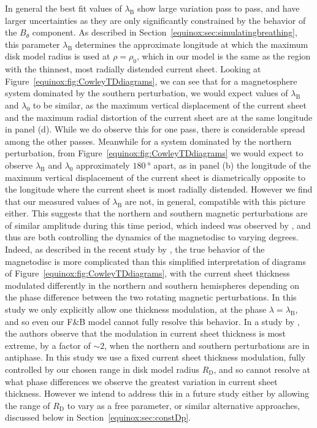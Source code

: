 In general the best fit values of $\lambda_\mathrm{B}$ show large variation pass to pass, and have larger uncertainties as they are only significantly constrained by the behavior of the $B_{\theta}$ component. As described in Section~\ref{equinox:sec:simulatingbreathing}, this parameter $\lambda_\mathrm{B}$ determines the approximate longitude at which the maximum disk model radius is used at $\rho = \rho_0$, which in our model is the same as the region with the thinnest, most radially distended current sheet. Looking at Figure~\ref{equinox:fig:CowleyTDdiagrams}, we can see that for a magnetosphere system dominated by the southern perturbation, we would expect values of $\lambda_\mathrm{B}$ and $\lambda_\mathrm{0}$ to be similar, as the maximum vertical displacement of the current sheet and the maximum radial distortion of the current sheet are at the same longitude in panel (d). While we do observe this for one pass, there is considerable spread among the other passes. Meanwhile for a system dominated by the northern perturbation, from Figure~\ref{equinox:fig:CowleyTDdiagrams} we would expect to observe $\lambda_\mathrm{B}$ and $\lambda_\mathrm{0}$ approximately $\SI{180}{\degree}$ apart, as in panel (b) the longitude of the maximum vertical displacement of the current sheet is diametrically opposite to the longitude where the current sheet is most radially distended. However we find that our measured values of $\lambda_\mathrm{B}$ are not, in general, compatible with this picture either. This suggests that the northern and southern magnetic perturbations are of similar amplitude during this time period, which indeed was observed by \citet{andrews2012}, and thus are both controlling the dynamics of the magnetodisc to varying degrees. Indeed, as described in the recent study by \citet{cowley2017b}, the true behavior of the magnetodisc is more complicated than this simplified interpretation of diagrams of Figure~\ref{equinox:fig:CowleyTDdiagrams}, with the current sheet thickness modulated differently in the northern and southern hemispheres depending on the phase difference between the two rotating magnetic perturbations. In this study we only explicitly allow one thickness modulation, at the phase $\lambda = \lambda_\mathrm{B}$, and so even our F{\&}B model cannot fully resolve this behavior. In a study by \citep{provan2012}, the authors observe that the modulation in current sheet thickness is most extreme, by a factor of ${\sim}2$, when the northern and southern perturbations are in antiphase. In this study we use a fixed current sheet thickness modulation, fully controlled by our chosen range in disk model radius $R_\mathrm{D}$, and so cannot resolve at what phase differences we observe the greatest variation in current sheet thickness. However we intend to address this in a future study either by allowing the range of $R_\mathrm{D}$ to vary as a free parameter, or similar alternative approaches, discussed below in Section~\ref{equinox:sec:constDp}.

